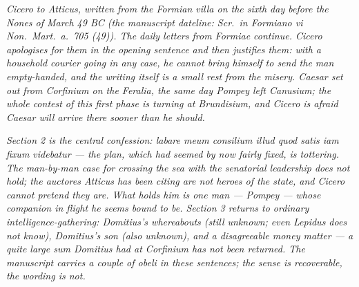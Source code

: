 
\textit{Cicero to Atticus, written from the Formian
villa on the sixth day before the Nones of March 49 BC
(the manuscript dateline: \textit{Scr.\ in Formiano vi
Non.\ Mart.\ a.\ 705 (49)}). The daily letters from
Formiae continue. Cicero apologises for them in the
opening sentence and then justifies them: with a
household courier going in any case, he cannot bring
himself to send the man empty-handed, and the writing
itself is a small rest from the misery. Caesar set out
from Corfinium on the Feralia, the same day Pompey
left Canusium; the whole contest of this first phase
is turning at Brundisium, and Cicero is afraid Caesar
will arrive there sooner than he should.}

\textit{Section 2 is the central confession: \textit{labare
meum consilium illud quod satis iam fixum videbatur}
--- the plan, which had seemed by now fairly fixed, is
tottering. The man-by-man case for crossing the sea
with the senatorial leadership does not hold; the
\textit{auctores} Atticus has been citing are not heroes
of the state, and Cicero cannot pretend they are. What
holds him is one man --- Pompey --- whose companion in
flight he seems bound to be. Section 3 returns to
ordinary intelligence-gathering: Domitius's
whereabouts (still unknown; even Lepidus does not
know), Domitius's son (also unknown), and a
disagreeable money matter --- a quite large sum
Domitius had at Corfinium has not been returned. The
manuscript carries a couple of obeli in these
sentences; the sense is recoverable, the wording is
not.}
